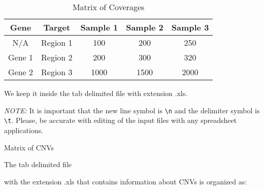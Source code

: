 \documentclass{article}
\begin{document}
\begin{table}[h]
\centering
\caption{Matrix of Coverages}
\label{matrixOfCoverages}
\begin{tabular}{|c|c|c|c|c|}
\hline
Gene                         & Target                        & Sample 1                  & Sample 2                  & Sample 3 \\ \hline
N/A                          & Region 1                      & 100                       & 200                       & 250      \\ \hline
Gene 1                       & Region 2                      & 200                       & 300                       & 320      \\ \hline
\multicolumn{1}{|l|}{Gene 2} & Region 3 & 1000 & 1500 &   2000       \\ \hline
\end{tabular}
\end{table}

We keep it inside the tab delimited file with extension .xls.

{\it NOTE:} It is important that the new line symbol is \texttt{\textbackslash n} and the delimiter symbol is \texttt{\textbackslash t}. Please, be accurate with editing of the input files with any spreadsheet applications.

\hfill \break


{\Large Matrix of CNVs}

\hypertarget{fileWithCNVs}{The tab delimited file} with the extension .xls that contains information about CNVs is organized as:
\end{document}
